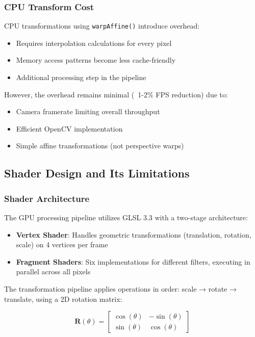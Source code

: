 \documentclass[12pt,a4paper]{article}
\begin{document}
\subsubsection{CPU Transform Cost}
CPU transformations using \texttt{warpAffine()} introduce overhead:
\begin{itemize}
    \item Requires interpolation calculations for every pixel
    \item Memory access patterns become less cache-friendly
    \item Additional processing step in the pipeline
\end{itemize}

However, the overhead remains minimal (~1-2\% FPS reduction) due to:
\begin{itemize}
    \item Camera framerate limiting overall throughput
    \item Efficient OpenCV implementation
    \item Simple affine transformations (not perspective warps)
\end{itemize}

\subsection{Shader Design and Its Limitations}

\subsubsection{Shader Architecture}
The GPU processing pipeline utilizes GLSL 3.3 with a two-stage architecture:

\begin{itemize}
    \item \textbf{Vertex Shader}: Handles geometric transformations (translation, rotation, scale) on 4 vertices per frame
    \item \textbf{Fragment Shaders}: Six implementations for different filters, executing in parallel across all pixels
\end{itemize}

The transformation pipeline applies operations in order: scale → rotate → translate, using a 2D rotation matrix:

\begin{equation}
\mathbf{R}(\theta) = \begin{bmatrix}
\cos(\theta) & -\sin(\theta) \\
\sin(\theta) & \cos(\theta)
\end{bmatrix}
\end{equation}
\end{document}
